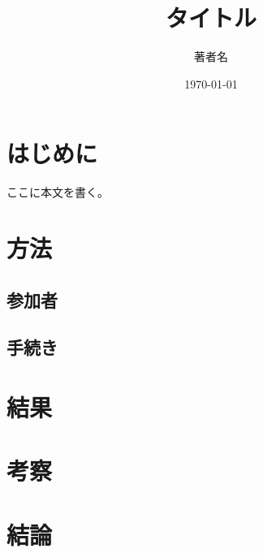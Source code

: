 \documentclass{ltjsarticle}
\title{タイトル}
\author{著者名}
\date{\today}
\begin{document}
\maketitle
\tableofcontents
\newpage

\section{はじめに}
ここに本文を書く。

\section{方法}

\subsection{参加者}

\subsection{手続き}

\section{結果}

\section{考察}

\section{結論}

\printbibliography[title=引用文献]
\end{document}
